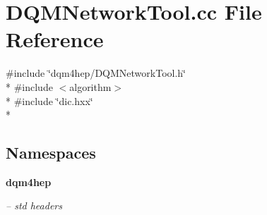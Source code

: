 \section{D\+Q\+M\+Network\+Tool.\+cc File Reference}
\label{DQMNetworkTool_8cc}
{\ttfamily \#include \char`\"{}dqm4hep/\+D\+Q\+M\+Network\+Tool.\+h\char`\"{}}\\*
{\ttfamily \#include $<$algorithm$>$}\\*
{\ttfamily \#include \char`\"{}dic.\+hxx\char`\"{}}\\*
\subsection*{Namespaces}
\begin{DoxyCompactItemize}
\item 
 {\bf dqm4hep}
\begin{DoxyCompactList}\small\item\em -- std headers \end{DoxyCompactList}\end{DoxyCompactItemize}
